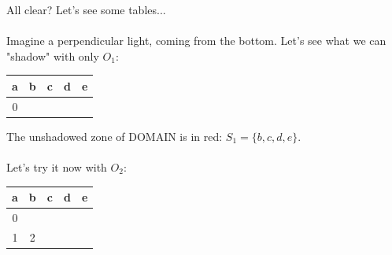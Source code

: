		\noindent
		All clear? Let's see some tables...
		\\\\
		
		\noindent
		Imagine a perpendicular light, coming from the bottom. Let's see what we can "shadow" with only $O_{1}$:\\
		\begin{table}[h!]
			\begin{center}
				\begin{tabular}{|c|c|c|c|c|}
					\hline
					\cellcolor{myblue} a & 
					\cellcolor{bosunired!50} b &
					\cellcolor{bosunired!50} c &
					\cellcolor{bosunired!50} d &
					\cellcolor{bosunired!50} e \\
					\hline
					\cellcolor{applegreen!50} 0 &
					\multicolumn{4}{|c|}{} \\
					\hline
				\end{tabular}
			\end{center}
		\end{table}
		
		\noindent
		The unshadowed zone of DOMAIN is in red: $S_{1} = \{b,c,d,e\}$.
		\\\\
		
		\noindent
		Let's try it now with $O_{2}$:\\
		\begin{table}[h!]
			\begin{center}
				\begin{tabular}{|c|c|c|c|c|}
					\hline
					\cellcolor{myblue} a & 
					\cellcolor{myblue} b &
					\cellcolor{bosunired!50} c &
					\cellcolor{bosunired!50} d &
					\cellcolor{bosunired!50} e \\
					\hline
					\cellcolor{applegreen!50} 0 &
					\multicolumn{4}{|c|}{} \\
					\hline
					\cellcolor{applegreen!50} 1 &
					\cellcolor{applegreen!50} 2 &
					\multicolumn{3}{|c|}{} \\
					\hline
				\end{tabular}
			\end{center}
		\end{table}
		
